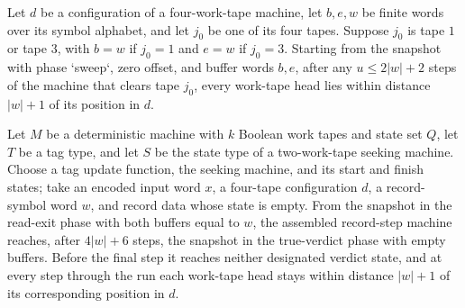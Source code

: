 \begin{theorem}
\label{Turing.recordStep_clear_heads}
\leanok
{}
Let $d$ be a configuration of a four-work-tape machine, let $b,e,w$ be finite words over
its symbol alphabet, and let $j_0$ be one of its four tapes. Suppose $j_0$ is tape $1$
or tape $3$, with $b=w$ if $j_0=1$ and $e=w$ if $j_0=3$. Starting from the snapshot with
phase `sweep`, zero offset, and buffer words $b,e$, after any $u\le 2|w|+2$ steps of the
machine that clears tape $j_0$, every work-tape head lies within distance $|w|+1$ of its
position in $d$.
\end{theorem}

\begin{theorem}
\label{Turing.recordStep_halt_run}
\leanok
{}
Let $M$ be a deterministic machine with $k$ Boolean work tapes and state set $Q$, let
$T$ be a tag type, and let $S$ be the state type of a two-work-tape seeking machine.
Choose a tag update function, the seeking machine, and its start and finish states; take
an encoded input word $x$, a four-tape configuration $d$, a record-symbol word $w$, and
record data whose state is empty. From the snapshot in the read-exit phase with both
buffers equal to $w$, the assembled record-step machine reaches, after $4|w|+6$ steps,
the snapshot in the true-verdict phase with empty buffers. Before the final step it
reaches neither designated verdict state, and at every step through the run each
work-tape head stays within distance $|w|+1$ of its corresponding position in $d$.
\end{theorem}

